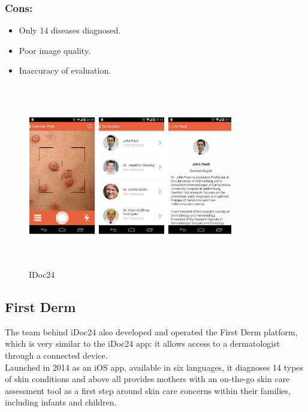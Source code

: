 \subsubsection{Cons:}
\begin{itemize}
     \item Only 14 diseases diagnosed.\\
     \item Poor image quality.\\
     \item Inaccuracy of evaluation.\\
\end{itemize}
\begin{figure}[H]
 \centering 
 \includegraphics[height= 8cm, width=9cm]{backmatter/figures/IDoc24.PNG} 
 \caption{IDoc24}
 \end{figure}
 
 
\subsection{First Derm}
The team behind iDoc24 also developed and operated the First Derm platform, which is very similar to the iDoc24 app: it allows access to a dermatologist through a connected device.\\

Launched in 2014 as an iOS app, available in six languages, it diagnoses 14 types of skin conditions and above all provides mothers with an on-the-go skin care assessment tool as a first step around skin care concerns within their families, including infants and children.\\

